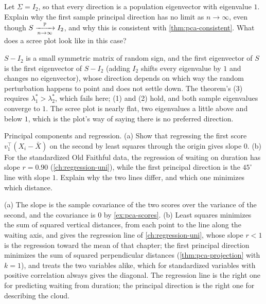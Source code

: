\begin{exercise}
\label{ex:pca-equal}
Let $\Sigma = I_2$, so that every direction is a population eigenvector with eigenvalue $1$. Explain why the first sample principal direction has no limit as $n \to \infty$, even though $S \xrightarrow [n \to \infty ]{\mathbb{P}} I_2$, and why this is consistent with \cref{thm:pca-consistent}. What does a scree plot look like in this case?
\end{exercise}
\begin{solution}
$S - I_2$ is a small symmetric matrix of random sign, and the first eigenvector of $S$ is the first eigenvector of $S - I_2$ (adding $I_2$ shifts every eigenvalue by $1$ and changes no eigenvector), whose direction depends on which way the random perturbation happens to point and does not settle down. The theorem's (3) requires $\lambda_1^* > \lambda_2^*$, which fails here; (1) and (2) hold, and both sample eigenvalues converge to $1$. The scree plot is nearly flat, two eigenvalues a little above and below $1$, which is the plot's way of saying there is no preferred direction.
\end{solution}

\begin{exercise}
\label{ex:pca-regression}
Principal components and regression. (a) Show that regressing the first score $v_1^\top(X_i - \bar{X})$ on the second by least squares through the origin gives slope $0$. (b) For the standardized Old Faithful data, the regression of waiting on duration has slope $r = 0.90$ (\cref{ch:regression-uni}), while the first principal direction is the $45^\circ$ line with slope $1$. Explain why the two lines differ, and which one minimizes which distance.
\end{exercise}
\begin{solution}
(a) The slope is the sample covariance of the two scores over the variance of the second, and the covariance is $0$ by \cref{ex:pca-scores}. (b) Least squares minimizes the sum of squared vertical distances, from each point to the line along the waiting axis, and gives the regression line of \cref{ch:regression-uni}, whose slope $r < 1$ is the regression toward the mean of that chapter; the first principal direction minimizes the sum of squared perpendicular distances (\cref{thm:pca-projection} with $k = 1$), and treats the two variables alike, which for standardized variables with positive correlation always gives the diagonal. The regression line is the right one for predicting waiting from duration; the principal direction is the right one for describing the cloud.
\end{solution}
